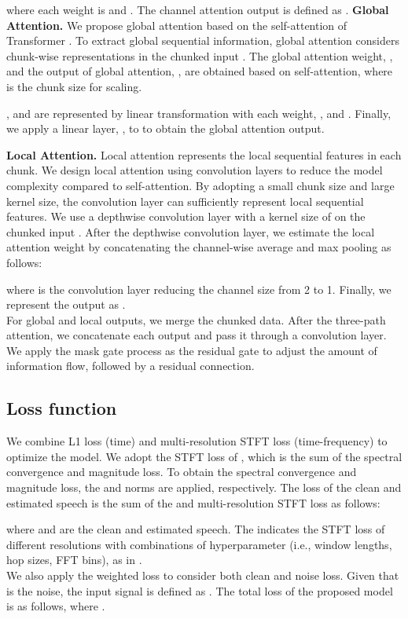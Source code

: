 \documentclass{article}
\begin{document}
\noindent where each weight is  and . The channel attention output is defined as .
\noindent \textbf{Global Attention.} We propose global attention based on the self-attention of Transformer \cite{vaswani2017attention}. To extract global sequential information, global attention considers chunk-wise representations in the chunked input . The global attention weight, , and the output of global attention, , are obtained based on self-attention, where  is the chunk size for scaling.

\noindent , and  are represented by linear transformation with each weight, , and . Finally, we apply a linear layer, , to  to obtain the global attention output.

\noindent \textbf{Local Attention.} Local attention represents the local sequential features in each chunk. We design local attention using convolution layers to reduce the model complexity compared to self-attention. By adopting a small chunk size and large kernel size, the convolution layer can sufficiently represent local sequential features. We use a depthwise convolution layer with a kernel size of  on the chunked input . After the depthwise convolution layer, we estimate the local attention weight  by concatenating the channel-wise average and max pooling as follows:

\noindent where  is the convolution layer reducing the channel size from 2 to 1. Finally, we represent the output as . \\
\indent For global and local outputs, we merge the chunked data. After the three-path attention, we concatenate each output and pass it through a convolution layer. We apply the mask gate process as the residual gate to adjust the amount of information flow, followed by a residual connection.
\subsection{Loss function}
\label{sec:loss}
We combine L1 loss (time) and multi-resolution STFT loss (time-frequency) \cite{defossez2020real, yamamoto2020parallel} to optimize the model. We adopt the STFT loss of \cite{defossez2020real}, which is the sum of the spectral convergence and magnitude loss. To obtain the spectral convergence and magnitude loss, the  and  norms are applied, respectively. The loss of the clean and estimated speech is the sum of the  and multi-resolution STFT loss as follows:

\noindent where  and  are the clean and estimated speech. The  indicates the STFT loss of different resolutions with combinations of hyperparameter (i.e., window lengths, hop sizes, FFT bins), as in \cite{defossez2020real}. \\
\indent We also apply the weighted loss \cite{choi2019phaseaware} to consider both clean and noise loss. Given that  is the noise, the input signal is defined as . The total loss of the proposed model is as follows, where .
\end{document}
